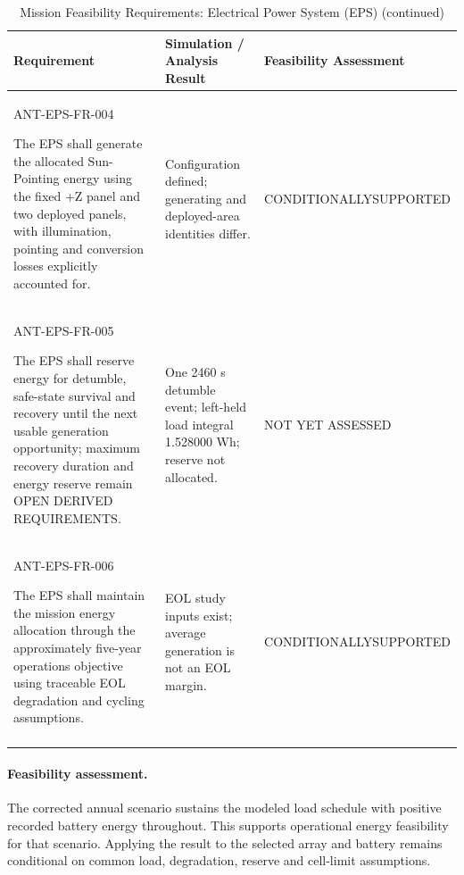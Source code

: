 \begin{table}[H]\centering\small\setlength{\tabcolsep}{3pt}
\ContinuedFloat\captionsetup{list=no}
\caption{Mission Feasibility Requirements: Electrical Power System (EPS) (continued)}
\begin{tabular}{@{}
>{\RaggedRight\arraybackslash}p{}
>{\RaggedRight\arraybackslash}p{}
>{\RaggedRight\arraybackslash}p{}
@{}}
\toprule Requirement & Simulation / Analysis Result & Feasibility Assessment\\\midrule
{}\label{req:ANT-EPS-FR-004}\mbox{ANT-EPS-}\newline\mbox{FR-004}\par The EPS shall generate the allocated Sun-Pointing energy using the fixed +Z panel and two deployed panels, with illumination, pointing and conversion losses explicitly accounted for. & Configuration defined; generating and deployed-area identities differ. & CONDITIONALLY\newline SUPPORTED\\
\addlinespace[3pt]
\label{req:ANT-EPS-FR-005}\mbox{ANT-EPS-}\newline\mbox{FR-005}\par The EPS shall reserve energy for detumble, safe-state survival and recovery until the next usable generation opportunity; maximum recovery duration and energy reserve remain OPEN DERIVED REQUIREMENTS. & One 2460 s detumble event; left-held load integral 1.528000 Wh; reserve not allocated. & NOT YET ASSESSED\\
\addlinespace[3pt]
\label{req:ANT-EPS-FR-006}\mbox{ANT-EPS-}\newline\mbox{FR-006}\par The EPS shall maintain the mission energy allocation through the approximately five-year operations objective using traceable EOL degradation and cycling assumptions. & EOL study inputs exist; average generation is not an EOL margin. & CONDITIONALLY\newline SUPPORTED\\
\addlinespace[3pt]
\bottomrule
\end{tabular}
\end{table}
\paragraph{Feasibility assessment.} The corrected annual scenario sustains the modeled load schedule with positive recorded battery energy throughout. This supports operational energy feasibility for that scenario. Applying the result to the selected array and battery remains conditional on common load, degradation, reserve and cell-limit assumptions.
